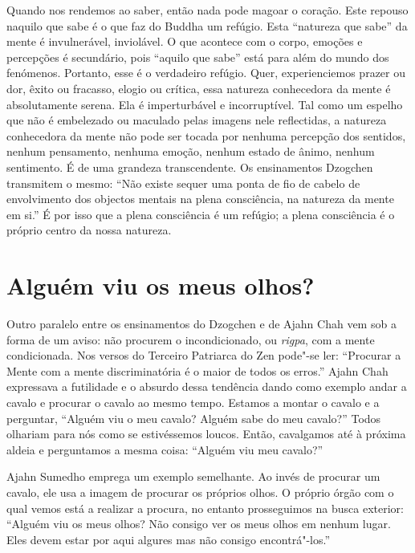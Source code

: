 Quando nos rendemos ao saber, então nada pode magoar o coração. Este
repouso naquilo que sabe é o que faz do Buddha um refúgio. Esta
``natureza que sabe'' da mente é invulnerável, inviolável. O que
acontece com o corpo, emoções e percepções é secundário, pois ``aquilo
que sabe'' está para além do mundo dos fenómenos. Portanto, esse é o
verdadeiro refúgio. Quer, experienciemos prazer ou dor, êxito ou
fracasso, elogio ou crítica, essa natureza conhecedora da mente é
absolutamente serena. Ela é imperturbável e incorruptível. Tal como um
espelho que não é embelezado ou maculado pelas imagens nele reflectidas,
a natureza conhecedora da mente não pode ser tocada por nenhuma
percepção dos sentidos, nenhum pensamento, nenhuma emoção, nenhum estado
de ânimo, nenhum sentimento. É de uma grandeza transcendente. Os
ensinamentos Dzogchen transmitem o mesmo: ``Não existe sequer uma ponta
de fio de cabelo de envolvimento dos objectos mentais na plena
consciência, na natureza da mente em si.'' É por isso que a plena
consciência é um refúgio; a plena consciência é o próprio centro da
nossa natureza.

\section{Alguém viu os meus olhos?}

Outro paralelo entre os ensinamentos do Dzogchen e de Ajahn Chah vem sob
a forma de um aviso: não procurem o incondicionado, ou \emph{rigpa}, com
a mente condicionada. Nos versos do Terceiro Patriarca do Zen pode"-se
ler: ``Procurar a Mente com a mente discriminatória é o maior de todos
os erros.'' Ajahn Chah expressava a futilidade e o absurdo dessa
tendência dando como exemplo andar a cavalo e procurar o cavalo ao mesmo
tempo. Estamos a montar o cavalo e a perguntar, ``Alguém viu o meu
cavalo? Alguém sabe do meu cavalo?'' Todos olhariam para nós como se
estivéssemos loucos. Então, cavalgamos até à próxima aldeia e
perguntamos a mesma coisa: ``Alguém viu meu cavalo?''

Ajahn Sumedho emprega um exemplo semelhante. Ao invés de procurar um
cavalo, ele usa a imagem de procurar os próprios olhos. O próprio órgão
com o qual vemos está a realizar a procura, no entanto prosseguimos na
busca exterior: ``Alguém viu os meus olhos? Não consigo ver os meus
olhos em nenhum lugar. Eles devem estar por aqui algures mas não consigo
encontrá"-los.''

